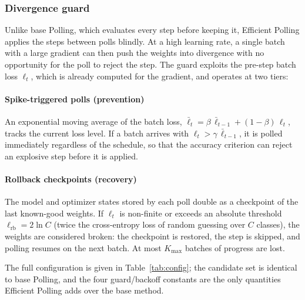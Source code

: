 \documentclass[conference]{IEEEtran}
\begin{document}
\subsubsection{Divergence guard}
Unlike base Polling, which evaluates every step before keeping it, Efficient Polling applies the steps between polls blindly. At a high learning rate, a single batch with a large gradient can then push the weights into divergence with no opportunity for the poll to reject the step. The guard exploits the pre-step batch loss $\ell_t$, which is already computed for the gradient, and operates at two tiers:

\paragraph{Spike-triggered polls (prevention)} An exponential moving average of the batch loss, $\bar{\ell}_t = \beta\,\bar{\ell}_{t-1} + (1-\beta)\,\ell_t$, tracks the current loss level. If a batch arrives with $\ell_t > \gamma\,\bar{\ell}_{t-1}$, it is polled immediately regardless of the schedule, so that the accuracy criterion can reject an explosive step before it is applied.

\paragraph{Rollback checkpoints (recovery)} The model and optimizer states stored by each poll double as a checkpoint of the last known-good weights. If $\ell_t$ is non-finite or exceeds an absolute threshold $\ell_{\mathrm{rb}} = 2\ln C$ (twice the cross-entropy loss of random guessing over $C$ classes), the weights are considered broken: the checkpoint is restored, the step is skipped, and polling resumes on the next batch. At most $K_{\max}$ batches of progress are lost.

The full configuration is given in Table~\ref{tab:config}; the candidate set is identical to base Polling, and the four guard/backoff constants are the only quantities Efficient Polling adds over the base method.
\end{document}

